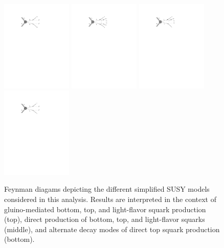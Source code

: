 \begin{figure}
	\includegraphics[width=0.30\textwidth]{results/figs/T2qq}
	\includegraphics[width=0.30\textwidth]{results/figs/T2bw}
	\includegraphics[width=0.30\textwidth]{results/figs/T2tb}
	\includegraphics[width=0.30\textwidth]{results/figs/T2cc}
	\renewcommand{\baselinestretch}{1.0}
	\caption[Feynman diagams depicting the different simplified SUSY models considered in this analysis.]{Feynman diagams depicting the different simplified SUSY models considered in this analysis. Results are interpreted in the context of gluino-mediated bottom, top, and light-flavor squark production (top), direct production of bottom, top, and light-flavor squarks (middle), and alternate decay modes of direct top squark production (bottom).}
	\label{fig:signalFeynman}
\end{figure}

